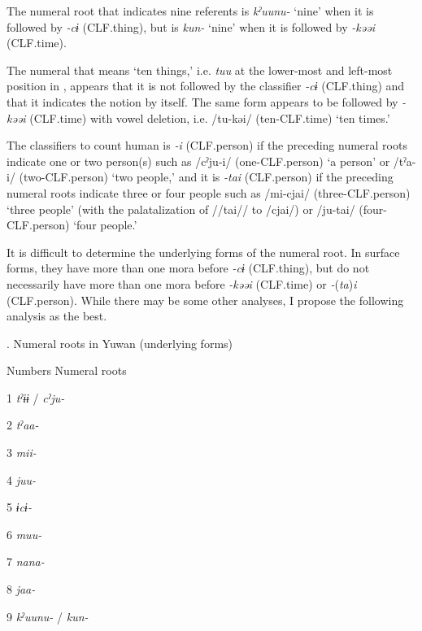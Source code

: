 \begin{styleBeschriftung}
\textmd{The numeral root that indicates nine referents is} \textmd{\textit{kˀuunu-}}\textmd{ ‘nine’ when it is followed by} \textmd{\textit{{}-cɨ}}\textmd{ (CLF.thing), but is} \textmd{\textit{kun-}}\textmd{ ‘nine’ when it is followed by} \textmd{\textit{{}-kəəi}}\textmd{ (CLF.time).}
\end{styleBeschriftung}

  The numeral that means ‘ten things,’ i.e. \textit{tuu} at the lower-most and left-most position in , appears that it is not followed by the classifier \textit{{}-cɨ} (CLF.thing) and that it indicates the notion by itself. The same form appears to be followed by \textit{{}-kəəi} (CLF.time) with vowel deletion, i.e. /tu-kəi/ (ten-CLF.time) ‘ten times.’

  The classifiers to count human is \textit{{}-i} (CLF.person) if the preceding numeral roots indicate one or two person(s) such as /cˀju-i/ (one-CLF.person) ‘a person’ or /tˀa-i/ (two-CLF.person) ‘two people,’ and it is \textit{{}-tai} (CLF.person) if the preceding numeral roots indicate three or four people such as /mi-cjai/ (three-CLF.person) ‘three people’ (with the palatalization of //tai// to /cjai/) or /ju-tai/ (four-CLF.person) ‘four people.’

  It is difficult to determine the underlying forms of the numeral root. In surface forms, they have more than one mora before \textit{{}-cɨ} (CLF.thing), but do not necessarily have more than one mora before \textit{{}-kəəi} (CLF.time) or \textit{{}-}(\textit{ta})\textit{i} (CLF.person). While there may be some other analyses, I propose the following analysis as the best.

\begin{styleBeschriftung}
\textmd{}\textmd{. Numeral roots in Yuwan (underlying forms)}
\end{styleBeschriftung}

Numbers  Numeral roots

1  \textit{tˀɨɨ} / \textit{cˀju-}

2  \textit{tˀaa-}

3  \textit{mii-}

4  \textit{juu-}

5  \textit{ɨcɨ-}

6  \textit{muu-}

7  \textit{nana-}

8  \textit{jaa-}

9  \textit{kˀuunu-} / \textit{kun-}

